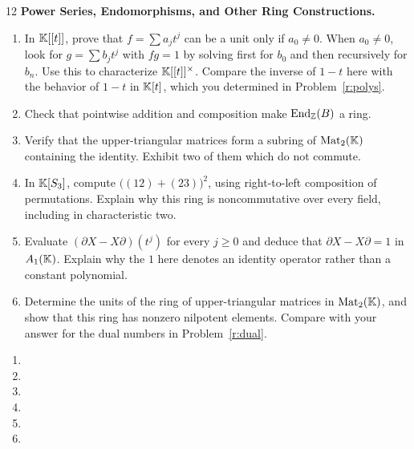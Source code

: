 \documentclass[Notebook.tex]{subfiles}
\begin{document}
\begin{problem}{12}\label{r:further}
	\textbf{Power Series, Endomorphisms, and Other Ring Constructions.}
	\begin{enumerate}[label=(\alph*),ref=\theenumi\alph*]
		\item In $\mathbb K[[t]]$, prove that $f=\sum a_jt^j$ can be a unit only if $a_0\ne0$. When $a_0\ne0$, look for $g=\sum b_jt^j$ with $fg=1$ by solving first for $b_0$ and then recursively for $b_n$. Use this to characterize $\mathbb K[[t]]^\times$. Compare the inverse of $1-t$ here with the behavior of $1-t$ in $\mathbb K[t]$, which you determined in Problem~\ref{r:polys}.
		\item Check that pointwise addition and composition make $\operatorname{End}_{\mathbb Z}(B)$ a ring.
		\item Verify that the upper-triangular matrices form a subring of $\operatorname{Mat}_2(\mathbb K)$ containing the identity. Exhibit two of them which do not commute.
		\item In $\mathbb K[S_3]$, compute $\big((12)+(23)\big)^2$, using right-to-left composition of permutations. Explain why this ring is noncommutative over every field, including in characteristic two.
		\item Evaluate $(\partial X-X\partial)(t^j)$ for every $j\geq0$ and deduce that $\partial X-X\partial=1$ in $A_1(\mathbb K)$. Explain why the $1$ here denotes an identity operator rather than a constant polynomial.
		\item Determine the units of the ring of upper-triangular matrices in $\operatorname{Mat}_2(\mathbb K)$, and show that this ring has nonzero nilpotent elements. Compare with your answer for the dual numbers in Problem~\ref{r:dual}.
	\end{enumerate}
\end{problem}

\begin{solution}
	\bbni
	\begin{enumerate}[label=(\alph*),ref=\theenumi\alph*]
		\item
		\item
		\item
		\item
		\item
		\item
	\end{enumerate}
\end{solution}
\end{document}
